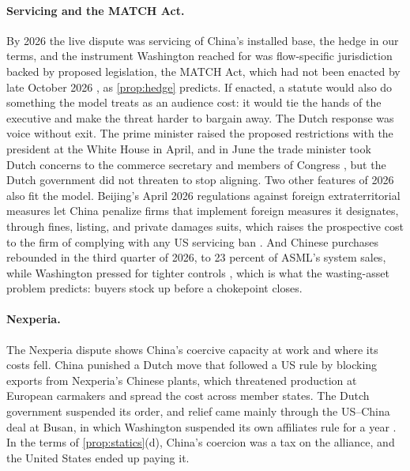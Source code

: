 \paragraph{Servicing and the MATCH Act.} By 2026 the live dispute was servicing of China's installed base, the hedge in our terms, and the instrument Washington reached for was flow-specific jurisdiction backed by proposed legislation, the MATCH Act, which had not been enacted by late October 2026 \citep{baumgartner2026match}, as \cref{prop:hedge} predicts. If enacted, a statute would also do something the model treats as an audience cost: it would tie the hands of the executive and make the threat harder to bargain away. The Dutch response was voice without exit. The prime minister raised the proposed restrictions with the president at the White House in April, and in June the trade minister took Dutch concerns to the commerce secretary and members of Congress \citep{nltimes2026pushback, vangerven2026dutch, nltimes2026irritated}, but the Dutch government did not threaten to stop aligning. Two other features of 2026 also fit the model. Beijing's April 2026 regulations against foreign extraterritorial measures let China penalize firms that implement foreign measures it designates, through fines, listing, and private damages suits, which raises the prospective cost to the firm of complying with any US servicing ban \citep{reedsmith2026decree}. And Chinese purchases rebounded in the third quarter of 2026, to 23 percent of ASML's system sales, while Washington pressed for tighter controls \citep{asml2026q3}, which is what the wasting-asset problem predicts: buyers stock up before a chokepoint closes.

\paragraph{Nexperia.} The Nexperia dispute shows China's coercive capacity at work and where its costs fell. China punished a Dutch move that followed a US rule by blocking exports from Nexperia's Chinese plants, which threatened production at European carmakers and spread the cost across member states. The Dutch government suspended its order, and relief came mainly through the US--China deal at Busan, in which Washington suspended its own affiliates rule for a year \citep{taylorwessing2025nexperia, mofcom2025suspension, asml2026annual}. In the terms of \cref{prop:statics}(d), China's coercion was a tax on the alliance, and the United States ended up paying it.

